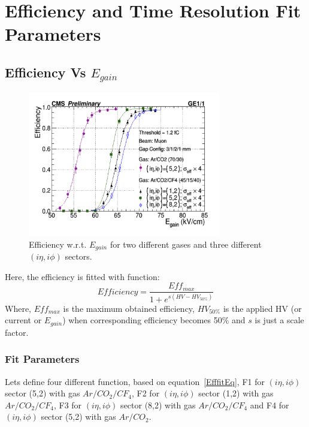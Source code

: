 \chapter{Efficiency and Time Resolution Fit Parameters} %
\label{cha:efficiency_and_time_resolution_fit_parameters}

\section{Efficiency Vs $E_{gain}$} %
\label{sec:efficiency_vs_egain}
\begin{figure}[!htbp]
\centering
\includegraphics[width=0.75\textwidth]{figures/GEM/Efficiency_EGain.jpeg}
\caption{Efficiency w.r.t. $E_{gain}$ for two different gases and three different $(i\eta,i\phi)$ sectors.}
\label{Efficiency1}
\end{figure}
Here, the efficiency is fitted with function:
\begin{equation}\label{EfffitEq}
    Efficiency = \frac{Eff_{max}}{1+e^{s(HV-HV_{50\%})}}
\end{equation}
Where, $Eff_{max}$ is the maximum obtained efficiency, $HV_{50\%}$ is the applied HV (or current or $E_{gain}$) when corresponding efficiency becomes 50\% and $s$ is just a scale factor.

\subsection{Fit Parameters} %
\label{sub:fit_parameters}
Lets define four different function, based on equation~\ref{EfffitEq}, F1 for $(i\eta,i\phi)$ sector (5,2) with gas $Ar/CO_2/CF_4$, F2 for $(i\eta,i\phi)$ sector (1,2) with gas $Ar/CO_2/CF_4$, F3 for $(i\eta,i\phi)$ sector (8,2) with gas $Ar/CO_2/CF_4$ and F4 for $(i\eta,i\phi)$ sector (5,2) with gas $Ar/CO_2$.

